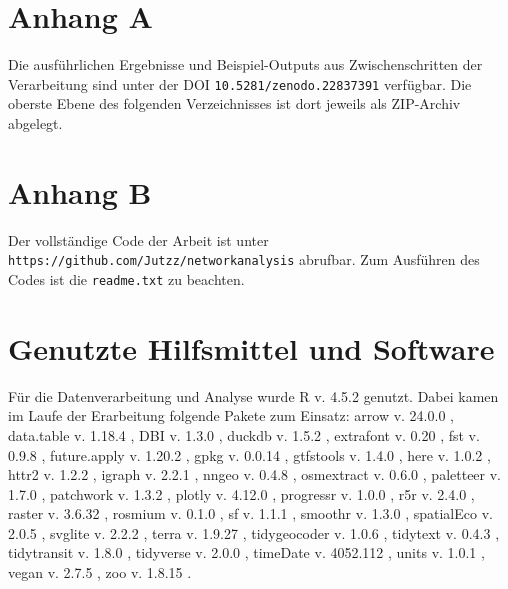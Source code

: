 \documentclass[11pt,pdftex,a4paper]{scrartcl}
\begin{document}
\pagebreak
{\singlespacing	
	\printbibliography
	\pagebreak
	\appendix
	\section*{Anhang A}
	\label{app:A}
	Die ausführlichen Ergebnisse und Beispiel-Outputs aus Zwischenschritten der Verarbeitung sind unter der DOI \texttt{10.5281/zenodo.22837391} verfügbar. Die oberste Ebene des folgenden Verzeichnisses ist dort jeweils als ZIP-Archiv abgelegt.  
	
	\section*{Anhang B}
	\label{app:B}
	Der vollständige Code der Arbeit ist unter \texttt{https://github.com/Jutzz/networkanalysis} abrufbar. Zum Ausführen des Codes ist die \texttt{readme.txt} zu beachten. 
	
	\clearpage
	\section*{Genutzte Hilfsmittel und Software}
	\label{app:C}
	Für die Datenverarbeitung und Analyse wurde R v. 4.5.2 \parencite{base} genutzt. Dabei kamen im Laufe der Erarbeitung folgende Pakete zum Einsatz: arrow v. 24.0.0 \parencite{arrow}, data.table v. 1.18.4 \parencite{datatable}, DBI v. 1.3.0 \parencite{DBI}, duckdb v. 1.5.2 \parencite{duckdb}, extrafont v. 0.20 \parencite{extrafont}, fst v. 0.9.8 \parencite{fst}, future.apply v. 1.20.2 \parencite{futureapply}, gpkg v. 0.0.14 \parencite{futureapply}, gtfstools v. 1.4.0 \parencite{gtfstools}, here v. 1.0.2 \parencite{here}, httr2 v. 1.2.2 \parencite{httr2}, igraph v. 2.2.1 \parencites{igraph2006}{igraph2023}{igraph2026}, nngeo v. 0.4.8 \parencite{nngeo}, osmextract v. 0.6.0 \parencite{osmextract}, paletteer v. 1.7.0 \parencite{paletteer}, patchwork v. 1.3.2 \parencite{patchwork}, plotly v. 4.12.0 \parencite{plotly}, progressr v. 1.0.0 \parencite{progressr}, r5r v. 2.4.0 \parencite{pereiraR5rRapidRealistic2021}, raster v. 3.6.32 \parencite{raster}, rosmium v. 0.1.0 \parencite{rosmium}, sf v. 1.1.1 \parencites{sf2018}{sf2023}, smoothr v. 1.3.0 \parencite{smoothr}, spatialEco v. 2.0.5 \parencite{spatialEco}, svglite v. 2.2.2 \parencite{svglite}, terra v. 1.9.27 \parencite{terra}, tidygeocoder v. 1.0.6 \parencite{tidygeocoder}, tidytext v. 0.4.3 \parencite{tidytext}, tidytransit v. 1.8.0 \parencite{polettiTidytransitReadValidate2025}, tidyverse v. 2.0.0 \parencite{tidyverse}, timeDate v. 4052.112 \parencite{timeDate}, units v. 1.0.1 \parencite{units}, vegan v. 2.7.5 \parencite{vegan}, zoo v. 1.8.15 \parencite{zoo}.
	
}
\end{document}
